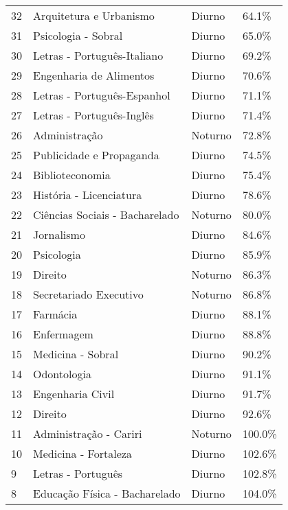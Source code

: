 \begin{tabular}{llll}
32 &             Arquitetura e Urbanismo &   Diurno &   64.1\% \\
31 &                 Psicologia - Sobral &   Diurno &   65.0\% \\
30 &         Letras - Português-Italiano &   Diurno &   69.2\% \\
29 &             Engenharia de Alimentos &   Diurno &   70.6\% \\
28 &         Letras - Português-Espanhol &   Diurno &   71.1\% \\
27 &           Letras - Português-Inglês &   Diurno &   71.4\% \\
26 &                       Administração &  Noturno &   72.8\% \\
25 &            Publicidade e Propaganda &   Diurno &   74.5\% \\
24 &                     Biblioteconomia &   Diurno &   75.4\% \\
23 &             História - Licenciatura &   Diurno &   78.6\% \\
22 &      Ciências Sociais - Bacharelado &  Noturno &   80.0\% \\
21 &                          Jornalismo &   Diurno &   84.6\% \\
20 &                          Psicologia &   Diurno &   85.9\% \\
19 &                             Direito &  Noturno &   86.3\% \\
18 &              Secretariado Executivo &  Noturno &   86.8\% \\
17 &                            Farmácia &   Diurno &   88.1\% \\
16 &                          Enfermagem &   Diurno &   88.8\% \\
15 &                   Medicina - Sobral &   Diurno &   90.2\% \\
14 &                         Odontologia &   Diurno &   91.1\% \\
13 &                    Engenharia Civil &   Diurno &   91.7\% \\
12 &                             Direito &   Diurno &   92.6\% \\
11 &              Administração - Cariri &  Noturno &  100.0\% \\
10 &                Medicina - Fortaleza &   Diurno &  102.6\% \\
9  &                  Letras - Português &   Diurno &  102.8\% \\
8  &       Educação Física - Bacharelado &   Diurno &  104.0\% \\

\end{tabular}
